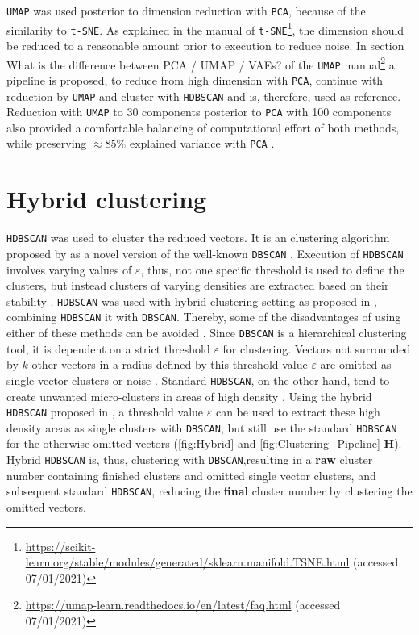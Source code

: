\vspace{1em}

\texttt{UMAP} was used posterior to dimension reduction with \texttt{PCA}, because of the similarity to \texttt{t-SNE}. As explained in the manual of \texttt{t-SNE}\footnote{\url{https://scikit-learn.org/stable/modules/generated/sklearn.manifold.TSNE.html} (accessed 07/01/2021)}, the dimension should be reduced to a reasonable amount prior to execution to reduce noise. In section \glqq What is the difference between PCA / UMAP / VAEs?\grqq{} of the \texttt{UMAP} manual\footnote{\url{https://umap-learn.readthedocs.io/en/latest/faq.html} (accessed 07/01/2021)} a pipeline is proposed, to reduce from high dimension with \texttt{PCA}, continue with reduction by \texttt{UMAP} and cluster with \texttt{HDBSCAN} and is, therefore, used as reference. Reduction with \texttt{UMAP} to 30 components posterior to \texttt{PCA} with 100 components also provided a comfortable balancing of computational effort of both methods, while preserving $\approx 85\%$ explained variance with \texttt{PCA} \autocite{mcinnes_umap_2020}. 

\section{Hybrid clustering} \label{sec:HDBSCAN}

\texttt{HDBSCAN} was used to cluster the reduced vectors. It is an clustering algorithm proposed by \textcite{campello_hierarchical_2015} as a novel version of the well-known \texttt{DBSCAN} \autocite{hutchison_density-based_2013}. Execution of \texttt{HDBSCAN} involves varying values of $\varepsilon$, thus, not one specific threshold is used to define the clusters, but instead clusters of varying densities are extracted based on their stability \autocite{mcinnes_hdbscan_2017}. \texttt{HDBSCAN} was used with hybrid clustering setting as proposed in \textcite{malzer_hybrid_2020}, combining \texttt{HDBSCAN} it with \texttt{DBSCAN}. Thereby, some of the disadvantages of using either of these methods can be avoided \autocite{mcinnes_hdbscan_2017, moulavi_density-based_2014}. Since \texttt{DBSCAN} is a hierarchical clustering tool, it is dependent on a strict threshold $\varepsilon$ for clustering. Vectors not surrounded by $k$ other vectors in a radius defined by this threshold value $\varepsilon$ are omitted as single vector clusters or noise \autocite{ester_density-based_1996, schubert_dbscan_2017}. Standard \texttt{HDBSCAN}, on the other hand, tend to create unwanted micro-clusters in areas of high density \autocite{mcinnes_hdbscan_2017}. Using the hybrid \texttt{HDBSCAN} proposed in \autocite{malzer_hybrid_2020}, a threshold value $\varepsilon$ can be used to extract these high density areas as single clusters with \texttt{DBSCAN}, but still use the standard \texttt{HDBSCAN} for the otherwise omitted vectors (\autoref{fig:Hybrid} and \autoref{fig:Clustering_Pipeline} \textsf{\textbf{H}}). Hybrid \texttt{HDBSCAN} is, thus, clustering with \texttt{DBSCAN},resulting in a \textbf{raw} cluster number containing finished clusters and omitted single vector clusters, and subsequent standard \texttt{HDBSCAN}, reducing the \textbf{final} cluster number by clustering the omitted vectors.

